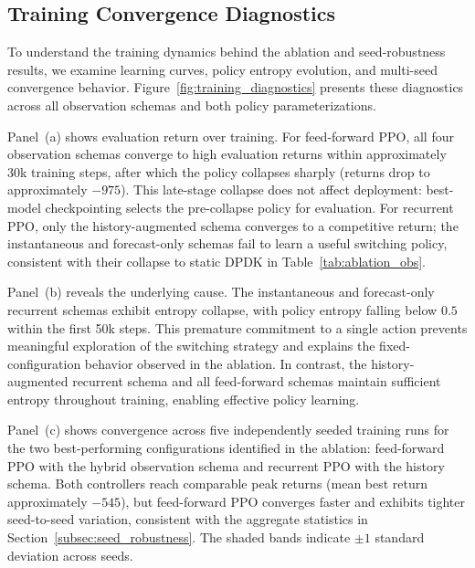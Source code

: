\documentclass[a4paper,fleqn]{cas-sc}
\begin{document}
\subsection{Training Convergence Diagnostics}
\label{subsec:training_diagnostics}

To understand the training dynamics behind the ablation and seed-robustness results, we examine learning curves, policy entropy evolution, and multi-seed convergence behavior. Figure~\ref{fig:training_diagnostics} presents these diagnostics across all observation schemas and both policy parameterizations.

Panel~(a) shows evaluation return over training. For feed-forward PPO, all four observation schemas converge to high evaluation returns within approximately 30k training steps, after which the policy collapses sharply (returns drop to approximately $-975$). This late-stage collapse does not affect deployment: best-model checkpointing selects the pre-collapse policy for evaluation. For recurrent PPO, only the history-augmented schema converges to a competitive return; the instantaneous and forecast-only schemas fail to learn a useful switching policy, consistent with their collapse to static DPDK in Table~\ref{tab:ablation_obs}.

Panel~(b) reveals the underlying cause. The instantaneous and forecast-only recurrent schemas exhibit entropy collapse, with policy entropy falling below $0.5$ within the first 50k steps. This premature commitment to a single action prevents meaningful exploration of the switching strategy and explains the fixed-configuration behavior observed in the ablation. In contrast, the history-augmented recurrent schema and all feed-forward schemas maintain sufficient entropy throughout training, enabling effective policy learning.

Panel~(c) shows convergence across five independently seeded training runs for the two best-performing configurations identified in the ablation: feed-forward PPO with the hybrid observation schema and recurrent PPO with the history schema. Both controllers reach comparable peak returns (mean best return approximately $-545$), but feed-forward PPO converges faster and exhibits tighter seed-to-seed variation, consistent with the aggregate statistics in Section~\ref{subsec:seed_robustness}. The shaded bands indicate $\pm 1$ standard deviation across seeds.
\end{document}
